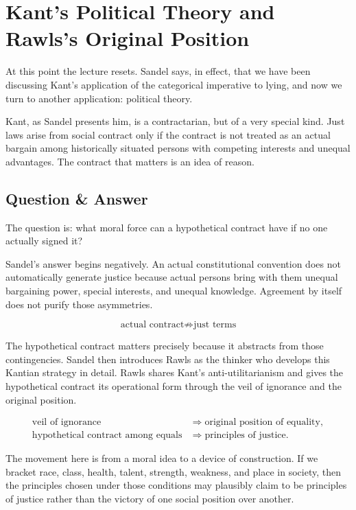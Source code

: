 \section{Kant's Political Theory and Rawls's Original Position}

At this point the lecture resets. Sandel says, in effect, that we have been discussing Kant's application of the categorical imperative to lying, and now we turn to another application: political theory.

Kant, as Sandel presents him, is a contractarian, but of a very special kind. Just laws arise from social contract only if the contract is not treated as an actual bargain among historically situated persons with competing interests and unequal advantages. The contract that matters is an idea of reason.

\subsection{Question \& Answer}

The question is: what moral force can a hypothetical contract have if no one actually signed it?

Sandel's answer begins negatively. An actual constitutional convention does not automatically generate justice because actual persons bring with them unequal bargaining power, special interests, and unequal knowledge. Agreement by itself does not purify those asymmetries.

\begin{equation}
\text{actual contract} \not\Longrightarrow \text{just terms}
\end{equation}

The hypothetical contract matters precisely because it abstracts from those contingencies. Sandel then introduces Rawls as the thinker who develops this Kantian strategy in detail. Rawls shares Kant's anti-utilitarianism and gives the hypothetical contract its operational form through the veil of ignorance and the original position.

\begin{align}
\text{veil of ignorance} &\Longrightarrow \text{original position of equality}, \\
\text{hypothetical contract among equals} &\Longrightarrow \text{principles of justice}.
\end{align}

The movement here is from a moral idea to a device of construction. If we bracket race, class, health, talent, strength, weakness, and place in society, then the principles chosen under those conditions may plausibly claim to be principles of justice rather than the victory of one social position over another.

